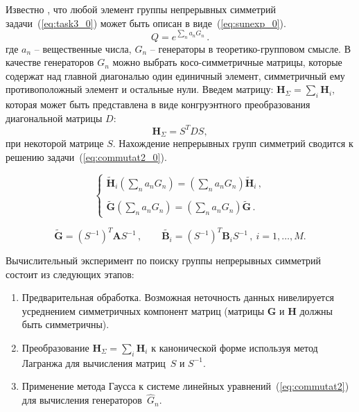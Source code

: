 Известно , что любой элемент группы непрерывных симметрий задачи~(\ref{eq:task3_0}) может быть описан в виде~(\ref{eq:sunexp_0}).
\begin{equation}
\label{eq:sunexp_0}
Q=e^{\sum\limits_n a_n G_n} \, .
\end{equation}
где $a_n$ -- вещественные числа, $G_n$ -- генераторы в теоретико-групповом смысле. В качестве генераторов $G_n$ можно выбрать косо-симметричные матрицы, которые содержат над главной диагональю один единичный элемент, симметричный ему противоположный элемент и остальные нули.
Введем матрицу: $ {\textbf{H}}_{\Sigma} = \sum_{i} \textbf{H}_i,$ которая может быть представлена в виде конгруэнтного преобразования диагональной матрицы $D$:
$${\textbf{H}}_{\Sigma} = S^TDS,$$
при некоторой матрице $S$.
Нахождение непрерывных групп симметрий сводится к решению задачи~(\ref{eq:commutat2_0}).

\begin{equation}
\label{eq:commutat2_0}
\left\{
\begin{array}{l}
\displaystyle
\tilde{\textbf{H}}_i \left(\sum\limits_na_nG_n\right) =
\left(\sum\limits_na_nG_n\right)\tilde{\textbf{H}}_i \, , \\ \\
\displaystyle
\tilde{\textbf{G}} \left(\sum\limits_na_nG_n\right) = \left(\sum\limits_na_nG_n\right)\tilde{\textbf{G}} \, .
\end{array}
\right.
\end{equation}

\begin{equation}
\tilde{\textbf{G}}=\left(S^{-1}\right)^T \textbf{A} S^{-1} \, , \qquad
\tilde{\textbf{B}_i}=\left(S^{-1}\right)^T \textbf{B}_i S^{-1} \, , \ i=1,\dots,M.
\end{equation}

Вычислительный эксперимент по поиску группы непрерывных симметрий состоит из следующих этапов:
\begin{enumerate}
  \item Предварительная обработка. Возможная неточность данных нивелируется усреднением симметричных компонент матриц (матрицы $\textbf{G}$ и $\textbf{H}$ должны быть симметричны).
  \item %
  Преобразование $ {\textbf{H}}_{\Sigma} = \sum_{i} \textbf{H}_i$ к канонической форме используя метод Лагранжа для вычисления матриц~$S$ и $S^{-1} $.
  \item Применение метода Гаусса к системе линейных уравнений~(\ref{eq:commutat2}) для вычисления генераторов~$\hat{G}_n$.
\end{enumerate}

